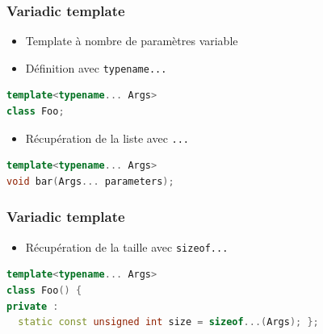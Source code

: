 \documentclass[C++.tex]{subfiles}
\begin{document}
\begin{frame}[fragile]
	\frametitle{Variadic template}
	\begin{itemize}
		\item Template à nombre de paramètres variable
		\item Définition avec \lstinline|typename...|
	\end{itemize}

	\begin{lstlisting}[language=C++]
template<typename... Args>
class Foo;\end{lstlisting}

	\begin{itemize}
		\item Récupération de la liste avec \lstinline|...|
	\end{itemize}

	\begin{lstlisting}[language=C++]
template<typename... Args>
void bar(Args... parameters);\end{lstlisting}
\end{frame}

\begin{frame}[fragile]
	\frametitle{Variadic template}
	\begin{itemize}
		\item Récupération de la taille avec \lstinline|sizeof...|
	\end{itemize}

	\begin{lstlisting}[language=C++]
template<typename... Args>
class Foo() {
private :
  static const unsigned int size = sizeof...(Args); };\end{lstlisting}
\end{frame}
\end{document}
